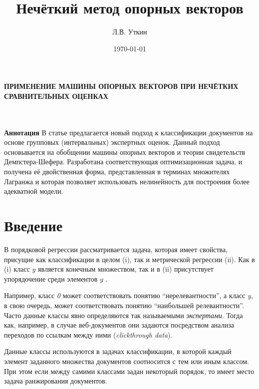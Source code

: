 \documentclass[12pt,a4paper,oneside]{article}
\title{Нечёткий метод опорных векторов}
\author{Л.В. Уткин}
\date{\today}
\begin{document}

\ApplyCommonPageStyle


\begin{center}
\textbf{\large ПРИМЕНЕНИЕ МАШИНЫ ОПОРНЫХ ВЕКТОРОВ ПРИ НЕЧЁТКИХ СРАВНИТЕЛЬНЫХ ОЦЕНКАХ}
\end{center}
\\
\\
{\footnotesize %
\textbf{Аннотация} В статье предлагается новый подход к классификации документов на основе групповых (интервальных) экспертных оценок. 
Данный подход основывается на обобщении машины опорных векторов и теории свидетельств Демпстера-Шефера. 
Разработана соответствующая оптимизационная задача, и получена её двойственная форма, представленная в терминах множителях Лагранжа и которая позволяет использовать нелинейность для построения более адекватной модели.
%
}


\section{Введение}
\label{sec:introduction}

\par
В порядковой регрессии рассматривается задача, которая имеет свойства, присущие как классификации в целом (i), так и метрической регрессии (ii). 
Как в (i) класс $y$ является конечным множеством, так и в (ii) присутствует упорядочение среди элементов $y$ .

\par
Например, класс \emph{0} может соответствовать понятию ``нерелевантности'', а класс \emph{y}, в свою очередь, может соответствовать понятию ``наибольшей релевантности''. 
Часто данные классы явно определяются так называемыми \emph{экспертами}. 
Тогда как, например, в случае веб-документов они задаются посредством анализа переходов по ссылкам между ними (\emph{clickthrough data}). 

\par
Данные классы используются в задачах классификации, в которой каждый элемент заданного множества документов соотносится с тем или иным классом. 
При этом если между самими классами задан некоторый порядок, то имеет место задача ранжирования документов. 
\end{document}
